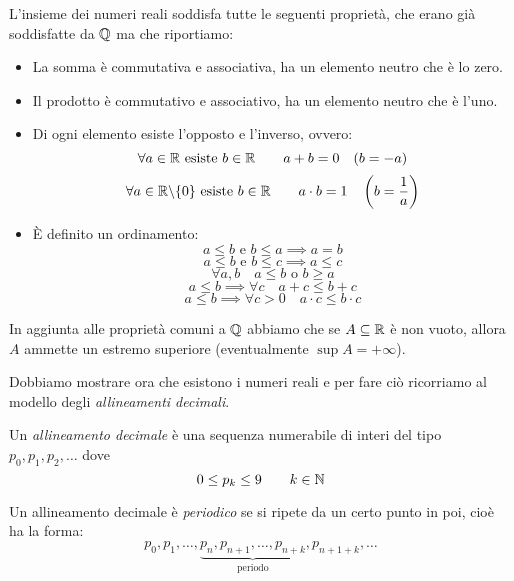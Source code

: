 L'insieme dei numeri reali soddisfa tutte le seguenti proprietà, che erano già soddisfatte da $\mathbb Q$ ma che riportiamo:
\begin{itemize}
\item La somma è commutativa e associativa, ha un elemento neutro che è lo zero.
\item Il prodotto è commutativo e associativo, ha un elemento neutro che è l'uno.
\item Di ogni elemento esiste l'opposto e l'inverso, ovvero:
\begin{equation*}
\forall a \in \mathbb R \text{ esiste } b \in \mathbb R \qquad a + b = 0 \quad (b=-a)
\end{equation*}
\begin{equation*}
\forall a \in \mathbb R\backslash\{0\} \text{ esiste } b \in \mathbb R \qquad a\cdot b = 1 \quad \left(b=\frac{1}{a}\right)
\end{equation*}
\item È definito un ordinamento:
\begin{equation*}
a \le b \text{ e } b \le a \implies a = b
\end{equation*}
\begin{equation*}
a \le b \text{ e } b \le c \implies a \le c
\end{equation*}
\begin{equation*}
\forall a, b \quad a \le b \text{ o } b \ge a
\end{equation*}
\begin{equation*}
a \le b \implies \forall c \quad a + c \le b + c
\end{equation*}
\begin{equation*}
a \le b \implies \forall c > 0 \quad a \cdot c \le b \cdot c
\end{equation*}
\end{itemize}

In aggiunta alle proprietà comuni a $\mathbb Q$ abbiamo che se $A \subseteq \mathbb R$ è non vuoto, allora $A$ ammette un estremo superiore (eventualmente $\sup  A = +\infty$).

Dobbiamo mostrare ora che esistono i numeri reali e per fare ciò ricorriamo al modello degli \emph{allineamenti decimali}.

Un \emph{allineamento decimale} è una sequenza numerabile di interi del tipo $p_0, p_1, p_2, \ldots $ dove
\begin{equation*}
0 \le p_k \le 9 \qquad k \in \mathbb N
\end{equation*}

Un allineamento decimale è \emph{periodico} se si ripete da un certo punto in poi, cioè ha la forma:
\begin{equation*}
p_0, p_1, \ldots, \underbrace{p_n, p_{n+1}, \ldots, p_{n+k}}_{\text{periodo}}, p_{n+1+k}, \ldots
\end{equation*}

